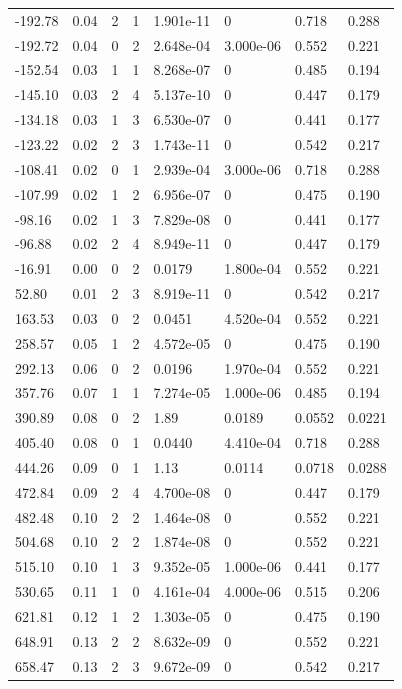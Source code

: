 \documentclass[preview]{standalone}
\begin{document}
{{\begin{tabular}{L{1.2cm}C{1.2cm} C{0.3cm}C{0.5cm} C{1.4cm}C{1.4cm} C{1.4cm}C{1.4cm}}
  -192.78  &  0.04  & 2     &  1 &  1.901e-11  & 0  & 0.718 &  0.288   \\ 
  -192.72  &  0.04  & 0     &  2 &  2.648e-04  & 3.000e-06  & 0.552 &  0.221   \\ 
  -152.54  &  0.03  & 1     &  1 &  8.268e-07  & 0  & 0.485 &  0.194   \\ 
  -145.10  &  0.03  & 2     &  4 &  5.137e-10  & 0  & 0.447 &  0.179   \\ 
  -134.18  &  0.03  & 1     &  3 &  6.530e-07  & 0  & 0.441 &  0.177   \\ 
  -123.22  &  0.02  & 2     &  3 &  1.743e-11  & 0  & 0.542 &  0.217   \\ 
  -108.41  &  0.02  & 0     &  1 &  2.939e-04  & 3.000e-06  & 0.718 &  0.288   \\ 
  -107.99  &  0.02  & 1     &  2 &  6.956e-07  & 0  & 0.475 &  0.190   \\ 
  -98.16  &  0.02  & 1     &  3 &  7.829e-08  & 0  & 0.441 &  0.177   \\ 
  -96.88  &  0.02  & 2     &  4 &  8.949e-11  & 0  & 0.447 &  0.179   \\ 
  -16.91  &  0.00  & 0     &  2 &  0.0179  & 1.800e-04  & 0.552 &  0.221   \\ 
  52.80  &  0.01  & 2     &  3 &  8.919e-11  & 0  & 0.542 &  0.217   \\ 
  163.53  &  0.03  & 0     &  2 &  0.0451  & 4.520e-04  & 0.552 &  0.221   \\ 
  258.57  &  0.05  & 1     &  2 &  4.572e-05  & 0  & 0.475 &  0.190   \\ 
  292.13  &  0.06  & 0     &  2 &  0.0196  & 1.970e-04  & 0.552 &  0.221   \\ 
  357.76  &  0.07  & 1     &  1 &  7.274e-05  & 1.000e-06  & 0.485 &  0.194   \\ 
  390.89  &  0.08  & 0     &  2 &  1.89  & 0.0189  & 0.0552 &  0.0221   \\ 
  405.40  &  0.08  & 0     &  1 &  0.0440  & 4.410e-04  & 0.718 &  0.288   \\ 
  444.26  &  0.09  & 0     &  1 &  1.13  & 0.0114  & 0.0718 &  0.0288   \\ 
  472.84  &  0.09  & 2     &  4 &  4.700e-08  & 0  & 0.447 &  0.179   \\ 
  482.48  &  0.10  & 2     &  2 &  1.464e-08  & 0  & 0.552 &  0.221   \\ 
  504.68  &  0.10  & 2     &  2 &  1.874e-08  & 0  & 0.552 &  0.221   \\ 
  515.10  &  0.10  & 1     &  3 &  9.352e-05  & 1.000e-06  & 0.441 &  0.177   \\ 
  530.65  &  0.11  & 1     &  0 &  4.161e-04  & 4.000e-06  & 0.515 &  0.206   \\ 
  621.81  &  0.12  & 1     &  2 &  1.303e-05  & 0  & 0.475 &  0.190   \\ 
  648.91  &  0.13  & 2     &  2 &  8.632e-09  & 0  & 0.552 &  0.221   \\ 
  658.47  &  0.13  & 2     &  3 &  9.672e-09  & 0  & 0.542 &  0.217   \\ 
\hline 
\end{tabular} 

}}
\end{document}
